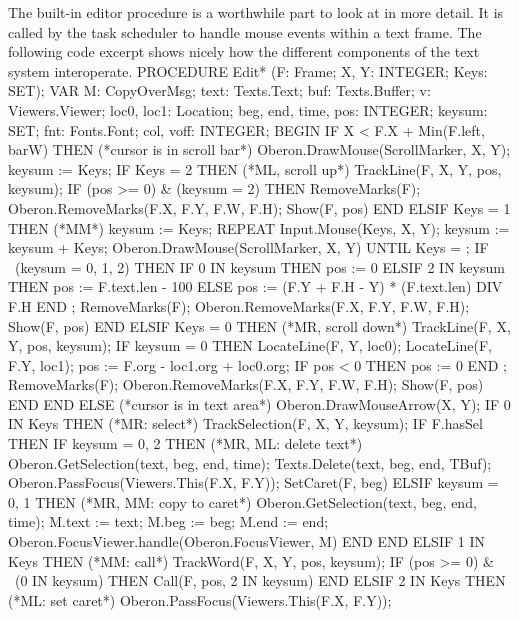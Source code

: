 \noindent The built-in editor procedure  is a worthwhile part to look at in more detail. It is called by the task scheduler to handle mouse events within a text frame. The following code excerpt shows nicely how the different components of the text system interoperate.
\begintt
PROCEDURE Edit* (F: Frame; X, Y: INTEGER; Keys: SET);
VAR M: CopyOverMsg;
    text: Texts.Text;
    buf: Texts.Buffer;
    v: Viewers.Viewer;
    loc0, loc1: Location;
    beg, end, time, pos: INTEGER; keysum: SET;
    fnt: Fonts.Font;
    col, voff: INTEGER;
BEGIN
  IF X < F.X + Min(F.left, barW) THEN (*cursor is in scroll bar*)
    Oberon.DrawMouse(ScrollMarker, X, Y);
    keysum := Keys;
    IF Keys = {2} THEN (*ML, scroll up*)
      TrackLine(F, X, Y, pos, keysum);
      IF (pos >= 0) & (keysum = {2}) THEN
        RemoveMarks(F); Oberon.RemoveMarks(F.X, F.Y, F.W, F.H);
          Show(F, pos)
      END
    ELSIF Keys = {1} THEN (*MM*)
      keysum := Keys;
      REPEAT Input.Mouse(Keys, X, Y); keysum := keysum + Keys;
        Oberon.DrawMouse(ScrollMarker, X, Y)
      UNTIL Keys = {};
      IF ~(keysum = {0, 1, 2}) THEN
        IF 0 IN keysum THEN pos := 0
        ELSIF 2 IN keysum THEN pos := F.text.len - 100
        ELSE pos := (F.Y + F.H - Y) * (F.text.len) DIV F.H
        END ;
        RemoveMarks(F); Oberon.RemoveMarks(F.X, F.Y, F.W, F.H);
        Show(F, pos)
      END
    ELSIF Keys = {0} THEN (*MR, scroll down*)
      TrackLine(F, X, Y, pos, keysum);
      IF keysum = {0} THEN
        LocateLine(F, Y, loc0); LocateLine(F, F.Y, loc1);
        pos := F.org - loc1.org + loc0.org;
        IF pos < 0 THEN pos := 0 END ;
        RemoveMarks(F); Oberon.RemoveMarks(F.X, F.Y, F.W, F.H);
        Show(F, pos)
      END
    END
  ELSE (*cursor is in text area*)
    Oberon.DrawMouseArrow(X, Y);
    IF 0 IN Keys THEN (*MR: select*)
      TrackSelection(F, X, Y, keysum);
      IF F.hasSel THEN
        IF keysum = {0, 2} THEN (*MR, ML: delete text*)
          Oberon.GetSelection(text, beg, end, time);
          Texts.Delete(text, beg, end, TBuf);
          Oberon.PassFocus(Viewers.This(F.X, F.Y)); SetCaret(F, beg)
        ELSIF keysum = {0, 1} THEN (*MR, MM: copy to caret*)
          Oberon.GetSelection(text, beg, end, time);
          M.text := text;
          M.beg := beg;
          M.end := end;
          Oberon.FocusViewer.handle(Oberon.FocusViewer, M)
        END
      END
    ELSIF 1 IN Keys THEN (*MM: call*)
      TrackWord(F, X, Y, pos, keysum);
      IF (pos >= 0) & ~(0 IN keysum) THEN Call(F, pos, 2 IN keysum) END
    ELSIF 2 IN Keys THEN (*ML: set caret*)
      Oberon.PassFocus(Viewers.This(F.X, F.Y));
